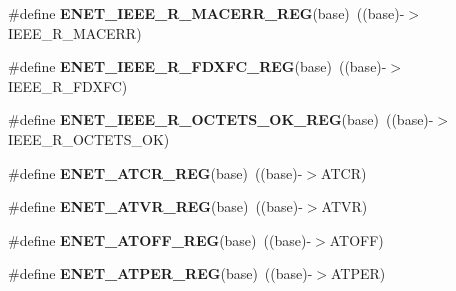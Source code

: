 \begin{DoxyCompactItemize}
\item 
\#define {\bfseries E\+N\+E\+T\+\_\+\+I\+E\+E\+E\+\_\+\+R\+\_\+\+M\+A\+C\+E\+R\+R\+\_\+\+R\+EG}(base)~((base)-\/$>$I\+E\+E\+E\+\_\+\+R\+\_\+\+M\+A\+C\+E\+RR)\hypertarget{group__ENET__Register__Accessor__Macros_gaae02a1de0556fcc3431991765180d28f}{}\label{group__ENET__Register__Accessor__Macros_gaae02a1de0556fcc3431991765180d28f}

\item 
\#define {\bfseries E\+N\+E\+T\+\_\+\+I\+E\+E\+E\+\_\+\+R\+\_\+\+F\+D\+X\+F\+C\+\_\+\+R\+EG}(base)~((base)-\/$>$I\+E\+E\+E\+\_\+\+R\+\_\+\+F\+D\+X\+FC)\hypertarget{group__ENET__Register__Accessor__Macros_ga1a9be5f0603c9812a67500be27884d83}{}\label{group__ENET__Register__Accessor__Macros_ga1a9be5f0603c9812a67500be27884d83}

\item 
\#define {\bfseries E\+N\+E\+T\+\_\+\+I\+E\+E\+E\+\_\+\+R\+\_\+\+O\+C\+T\+E\+T\+S\+\_\+\+O\+K\+\_\+\+R\+EG}(base)~((base)-\/$>$I\+E\+E\+E\+\_\+\+R\+\_\+\+O\+C\+T\+E\+T\+S\+\_\+\+OK)\hypertarget{group__ENET__Register__Accessor__Macros_gaa44e17cc615d26f01a3286728c456b29}{}\label{group__ENET__Register__Accessor__Macros_gaa44e17cc615d26f01a3286728c456b29}

\item 
\#define {\bfseries E\+N\+E\+T\+\_\+\+A\+T\+C\+R\+\_\+\+R\+EG}(base)~((base)-\/$>$A\+T\+CR)\hypertarget{group__ENET__Register__Accessor__Macros_ga61c2d4ab6510171bbeb84a9163f8238d}{}\label{group__ENET__Register__Accessor__Macros_ga61c2d4ab6510171bbeb84a9163f8238d}

\item 
\#define {\bfseries E\+N\+E\+T\+\_\+\+A\+T\+V\+R\+\_\+\+R\+EG}(base)~((base)-\/$>$A\+T\+VR)\hypertarget{group__ENET__Register__Accessor__Macros_ga617ff41003bad76c121aa4830cac62e0}{}\label{group__ENET__Register__Accessor__Macros_ga617ff41003bad76c121aa4830cac62e0}

\item 
\#define {\bfseries E\+N\+E\+T\+\_\+\+A\+T\+O\+F\+F\+\_\+\+R\+EG}(base)~((base)-\/$>$A\+T\+O\+FF)\hypertarget{group__ENET__Register__Accessor__Macros_ga3df11603011fd47de55a17c27300ead3}{}\label{group__ENET__Register__Accessor__Macros_ga3df11603011fd47de55a17c27300ead3}

\item 
\#define {\bfseries E\+N\+E\+T\+\_\+\+A\+T\+P\+E\+R\+\_\+\+R\+EG}(base)~((base)-\/$>$A\+T\+P\+ER)\hypertarget{group__ENET__Register__Accessor__Macros_ga8925d2e7feb44aa151ef2f409ceda379}{}\label{group__ENET__Register__Accessor__Macros_ga8925d2e7feb44aa151ef2f409ceda379}


\end{DoxyCompactItemize}
